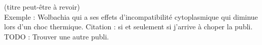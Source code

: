 
(titre peut-être à revoir)\\
Exemple : Wolbachia qui a ses effets d'incompatibilité cytoplasmique qui diminue lors d'un choc thermique.
Citation : \citet{arakaki2001} si et seulement si j'arrive à choper la publi.
TODO : Trouver une autre publi.